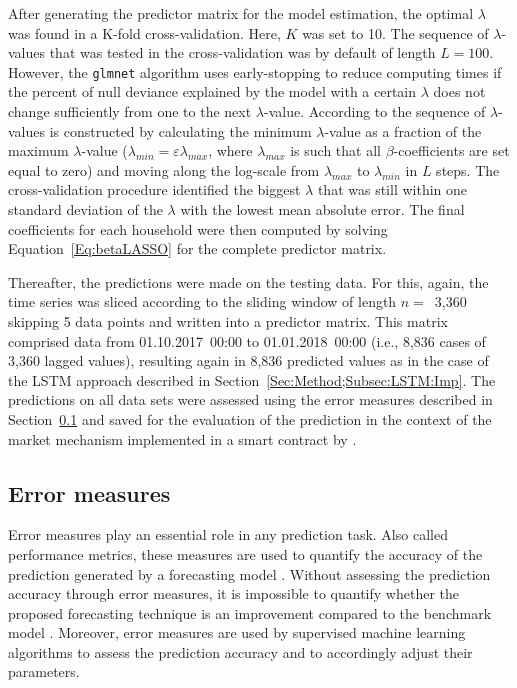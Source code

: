 \newpage
After generating the predictor matrix for the model estimation, the optimal $\lambda$ was found in a K-fold cross-validation. Here, $K$ was set to 10. The sequence of $\lambda$-values that was tested in the cross-validation was by default of length $L=100$. However, the \texttt{glmnet} algorithm uses early-stopping to reduce computing times if the percent of null deviance explained by the model with a certain $\lambda$ does not change sufficiently from one to the next $\lambda$-value. According to \citet{Friedman:2010} the sequence of $\lambda$-values is constructed by calculating the minimum $\lambda$-value as a fraction of the maximum $\lambda$-value ($\lambda_{min}=\varepsilon\lambda_{max}$, where $\lambda_{max}$ is such that all $\beta$-coefficients are set equal to zero) and moving along the log-scale from $\lambda_{max}$ to $\lambda_{min}$ in $L$ steps. The cross-validation procedure identified the biggest $\lambda$ that was still within one standard deviation of the $\lambda$ with the lowest mean absolute error. The final coefficients for each household were then computed by solving Equation~\ref{Eq:betaLASSO} for the complete predictor matrix.

Thereafter, the predictions were made on the testing data. For this, again, the time series was sliced according to the sliding window of length $n=$~3,360 skipping 5 data points and written into a predictor matrix. This matrix comprised data from 01.10.2017~00:00 to 01.01.2018~00:00 (i.e., 8,836 cases of 3,360 lagged values), resulting again in 8,836 predicted values as in the case of the LSTM approach described in Section~\ref{Sec:Method;Subsec:LSTM:Imp}. The predictions on all data sets were assessed using the error measures described in Section~\ref{Sec:Method;Subsec:Error} and saved for the evaluation of the prediction in the context of the market mechanism implemented in a smart contract by \citet{Mengelkamp:2018a}.



\subsection{Error measures} \label{Sec:Method;Subsec:Error}

Error measures play an essential role in any prediction task. Also called performance metrics, these measures are used to quantify the accuracy of the prediction generated by a forecasting model \citep{zor:2017}. Without assessing the prediction accuracy through error measures, it is impossible to quantify whether the proposed forecasting technique is an improvement compared to the benchmark model \citep{Meer:2018}. Moreover, error measures are used by supervised machine learning algorithms to assess the prediction accuracy and to accordingly adjust their parameters.


